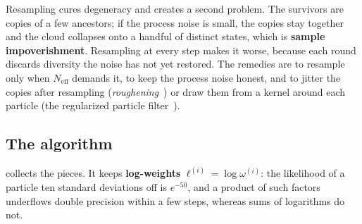Resampling cures degeneracy and creates a second problem. The survivors are
copies of a few ancestors; if the process noise is small, the copies stay
together and the cloud collapses onto a handful of distinct states, which is
\textbf{sample impoverishment}. Resampling at every step makes it worse, because
each round discards diversity the noise has not yet restored. The remedies
are to resample only when $N_{\mathrm{eff}}$ demands it, to keep the
process noise honest, and to jitter the copies after resampling
(\emph{roughening}~\cite{gordon1993novel}) or draw them
from a kernel around each particle (the regularized particle
filter~\cite{arulampalam2002tutorial}).

\subsection{The algorithm}
\label{sec:ch19-pf-algorithm}

 collects the pieces. It keeps \textbf{log-weights}
 $\ell^{(i)} = \log \omega^{(i)}$: the likelihood of a
particle ten standard deviations off is $e^{-50}$, and a product of such
factors underflows double precision within a few steps, whereas sums of
logarithms do not.

\begin{algorithm}[htb]
\caption{One step of the bootstrap particle filter with systematic resampling}
\label{alg:ch19-pf}
\end{algorithm}

